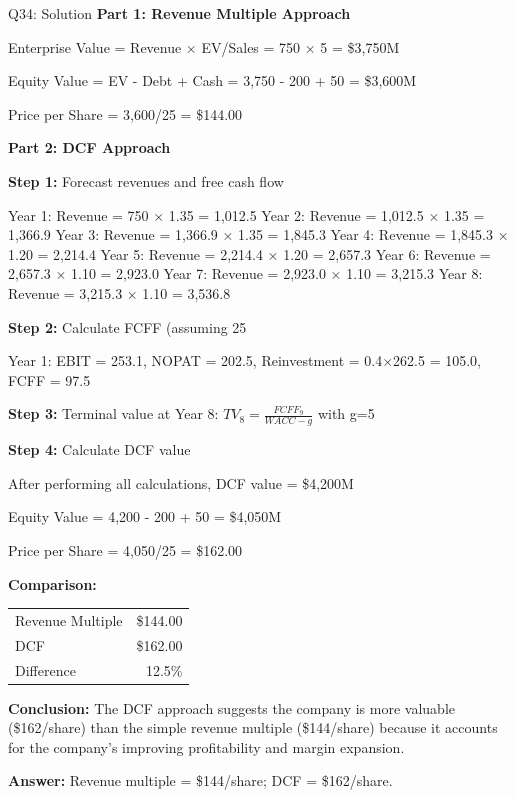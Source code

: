 \documentclass{beamer}
\renewcommand{\scriptsize}{\fontsize{6pt}{7pt}\selectfont}
\begin{document}
	\begin{frame}{Q34: Solution}
		\scriptsize
		\textbf{Part 1: Revenue Multiple Approach}
		
		Enterprise Value = Revenue × EV/Sales = 750 × 5 = \$3,750M
		
		Equity Value = EV - Debt + Cash = 3,750 - 200 + 50 = \$3,600M
		
		Price per Share = 3,600/25 = \$144.00
		
		\vspace{2pt}
		\textbf{Part 2: DCF Approach}
		
		\textbf{Step 1:} Forecast revenues and free cash flow
		
		Year 1: Revenue = 750 × 1.35 = 1,012.5
		Year 2: Revenue = 1,012.5 × 1.35 = 1,366.9
		Year 3: Revenue = 1,366.9 × 1.35 = 1,845.3
		Year 4: Revenue = 1,845.3 × 1.20 = 2,214.4
		Year 5: Revenue = 2,214.4 × 1.20 = 2,657.3
		Year 6: Revenue = 2,657.3 × 1.10 = 2,923.0
		Year 7: Revenue = 2,923.0 × 1.10 = 3,215.3
		Year 8: Revenue = 3,215.3 × 1.10 = 3,536.8
		
		\vspace{2pt}
		\textbf{Step 2:} Calculate FCFF (assuming 25%
		
		Year 1: EBIT = 253.1, NOPAT = 202.5, Reinvestment = 0.4×262.5 = 105.0, FCFF = 97.5
		
		\vspace{2pt}
		\textbf{Step 3:} Terminal value at Year 8: $TV_8 = \frac{FCFF_9}{WACC - g}$ with g=5%
		
		\vspace{2pt}
		\textbf{Step 4:} Calculate DCF value
		
		After performing all calculations, DCF value = \$4,200M
		
		Equity Value = 4,200 - 200 + 50 = \$4,050M
		
		Price per Share = 4,050/25 = \$162.00
		
		\vspace{2pt}
		\textbf{Comparison:}
		\begin{tabular}{lr}
			Revenue Multiple & \$144.00 \\
			DCF & \$162.00 \\
			Difference & 12.5\% \\
		\end{tabular}
		
		\vspace{2pt}
		\textbf{Conclusion:} The DCF approach suggests the company is more valuable (\$162/share) than the simple revenue multiple (\$144/share) because it accounts for the company's improving profitability and margin expansion.
		
		\textbf{Answer:} Revenue multiple = \$144/share; DCF = \$162/share.
	\end{frame}
	
\end{document}

